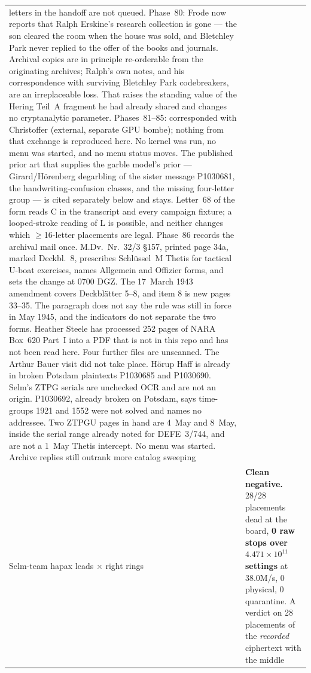 \documentclass[11pt,a4paper]{article}
\begin{document}
{\begin{longtable}{@{}p{}p{}@{}}
  letters in the handoff are not queued.
  Phase~80: Frode now reports that Ralph Erskine's research collection is gone ---
  the son cleared the room when the house was sold, and Bletchley Park never
  replied to the offer of the books and journals. Archival copies are in principle
  re-orderable from the originating archives; Ralph's own notes, and his
  correspondence with surviving Bletchley Park codebreakers, are an irreplaceable
  loss. That raises the standing value of the Hering Teil~A fragment he had already
  shared and changes no cryptanalytic parameter.
  Phases~81--85: corresponded with Christoffer (external, separate GPU bombe);
  nothing from that exchange is reproduced here. No kernel was run, no menu was
  started, and no menu status moves. The published prior art that supplies the
  garble model's prior --- Girard/H\"orenberg degarbling of the sister message
  P1030681, the handwriting-confusion classes, and the missing four-letter
  group --- is cited separately below and stays. Letter~68 of the form reads C
  in the transcript and every campaign fixture; a looped-stroke reading of L
  is possible, and neither changes which $\ge$16-letter placements are legal.
  Phase~86 records the archival mail once. M.Dv.~Nr.~32/3 \S157, printed
  page 34a, marked Deckbl.~8, prescribes Schl\"ussel~M Thetis for tactical
  U-boat exercises, names Allgemein and Offizier forms, and sets the change
  at 0700 DGZ. The 17~March 1943 amendment covers Deckbl\"atter 5--8, and
  item 8 is new pages 33--35. The paragraph does not say the rule was still
  in force in May 1945, and the indicators do not separate the two forms.
  Heather Steele has processed 252 pages of NARA Box~620 Part~I into a PDF
  that is not in this repo and has not been read here. Four further files
  are unscanned. The Arthur Bauer visit did not take place. H\"orup Haff is
  already in broken Potsdam plaintexts P1030685 and P1030690. Selm's ZTPG
  serials are unchecked OCR and are not an origin. P1030692, already broken
  on Potsdam, says time-groups 1921 and 1552 were not solved and names no
  addressee.   Two ZTPGU pages in hand are 4~May and
  8~May, inside the serial range already noted for DEFE~3/744, and are not
  a 1~May Thetis intercept. No menu was started.
  Archive replies still
  outrank more catalog sweeping \\
Selm-team hapax leads $\times$ right rings & \textbf{Clean negative.} 28/28 placements dead at
  the board, \textbf{0 raw stops over $4.471\times10^{11}$ settings} at 38.0M/s, 0 physical,
  0 quarantine. A verdict on 28 placements of the \emph{recorded} ciphertext with the middle

\end{longtable}}
\end{document}
